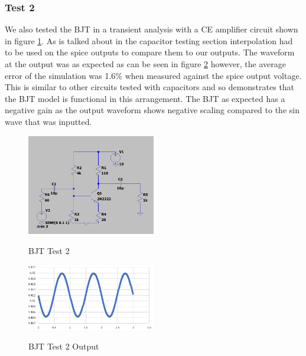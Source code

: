 \documentclass{article}
\begin{document}
\subsubsection{Test 2}
We also tested the BJT in a transient analysis with a CE amplifier circuit shown in figure \ref{fig:BJTTest2}. As is talked about in the capacitor testing section interpolation had to be used on the spice outputs to compare them to our outputs. The waveform at the output was as expected as can be seen in figure \ref{fig:BJTOutput2} however, the average error of the simulation was 1.6\% when measured against the spice output voltage. This is similar to other circuits tested with capacitors and so demonstrates that the BJT model is functional in this arrangement. The BJT as expected has a negative gain as the output waveform shows negative scaling compared to the sin wave that was inputted. 
\begin{figure}[h]
    \caption{BJT Test 2}
    \centering
    \includegraphics[width=0.5\textwidth]{images/BJTTest2.png}
    \label{fig:BJTTest2}
\end{figure}
\begin{figure}[h]
    \caption{BJT Test 2 Output}
    \centering
    \includegraphics[width=0.5\textwidth]{images/BJTOutput2.png}
    \label{fig:BJTOutput2}
\end{figure}
\end{document}

